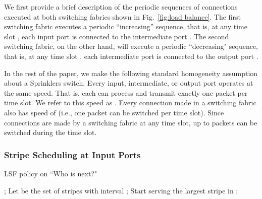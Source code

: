 We first provide a brief description of the periodic sequences of connections executed at both switching fabrics shown in Fig.~\ref{fig:load balance}.
The first switching fabric executes a periodic ``increasing'' sequence, that is, at any time slot , each input port  is connected
to the intermediate port .  
The second switching fabric, on the other hand, will execute a periodic ``decreasing" sequence, that is, 
at any time slot , each intermediate port  is connected to the output port .  

In the rest of the paper, we make the following standard homogeneity assumption about a Sprinklers switch.  
Every input, intermediate, or output port
operates at the same speed.  That is, each can process and transmit exactly one packet per time slot.  We refer to this speed
as .  Every connection made in a switching fabric also has speed of  (i.e., one packet can be switched per time slot).
Since  connections are made by a switching fabric at any time slot, up to  packets can be switched during the time 
slot.













\subsubsection{Stripe Scheduling at Input Ports}
\label{sec:scheduling input}







\begin{algorithm}
\caption{LSF policy on ``Who is next?"}
\label{alg:select next VOQ to serve}
  \begin{algorithmic}[1]
  \State ; 
      \State Let  be the set of stripes with interval ;
        \State Start serving the largest stripe in ;
\EndIf
    \EndIf
  \end{algorithmic}
\end{algorithm}



